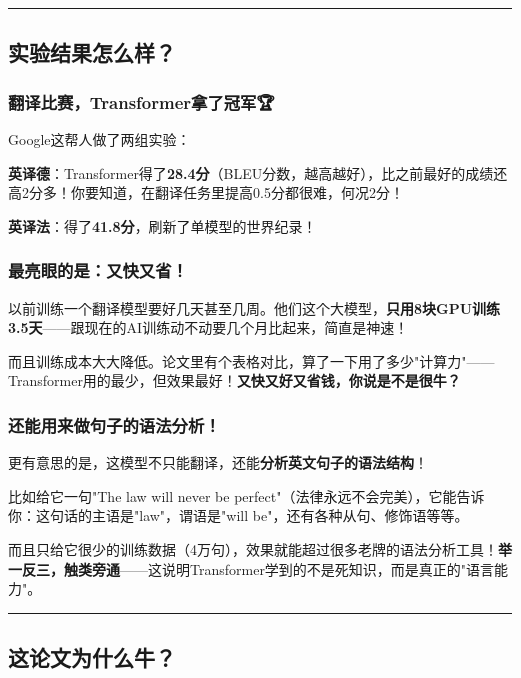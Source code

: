 \documentclass[11pt,a4paper]{article}
\begin{document}
\vspace{0.5em}\noindent\rule{\textwidth}{0.4pt}\vspace{0.5em}

\subsection*{实验结果怎么样？}

\subsubsection*{翻译比赛，Transformer拿了冠军🏆}

Google这帮人做了两组实验：

\textbf{英译德}：Transformer得了\textbf{28.4分}（BLEU分数，越高越好），比之前最好的成绩还高2分多！你要知道，在翻译任务里提高0.5分都很难，何况2分！

\textbf{英译法}：得了\textbf{41.8分}，刷新了单模型的世界纪录！

\subsubsection*{最亮眼的是：又快又省！}

以前训练一个翻译模型要好几天甚至几周。他们这个大模型，\textbf{只用8块GPU训练3.5天}——跟现在的AI训练动不动要几个月比起来，简直是神速！

而且训练成本大大降低。论文里有个表格对比，算了一下用了多少"计算力"——Transformer用的最少，但效果最好！\textbf{又快又好又省钱，你说是不是很牛？}

\subsubsection*{还能用来做句子的语法分析！}

更有意思的是，这模型不只能翻译，还能\textbf{分析英文句子的语法结构}！

比如给它一句"The law will never be perfect"（法律永远不会完美），它能告诉你：这句话的主语是"law"，谓语是"will be"，还有各种从句、修饰语等等。

而且只给它很少的训练数据（4万句），效果就能超过很多老牌的语法分析工具！\textbf{举一反三，触类旁通}——这说明Transformer学到的不是死知识，而是真正的"语言能力"。

\vspace{0.5em}\noindent\rule{\textwidth}{0.4pt}\vspace{0.5em}

\subsection*{这论文为什么牛？}
\end{document}
